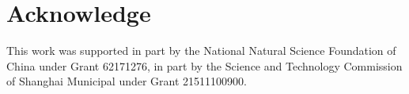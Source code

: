 \documentclass[letterpaper, 10 pt, conference]{ieeeconf}  %
\begin{document}

\section{Acknowledge}
This work was supported in part by the National Natural Science Foundation of China under Grant 62171276, in part by the Science and Technology Commission of Shanghai Municipal under Grant 21511100900.



\end{document}
